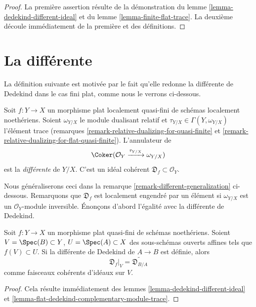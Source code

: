 \begin{proof}
La première assertion
résulte de la démonstration du lemme \ref{lemma-dedekind-different-ideal}
et du lemme \ref{lemma-finite-flat-trace}.
La deuxième découle immédiatement de la première et des
définitions.
\end{proof}



\section{La différente}
\label{section-different}

\noindent
La définition suivante est motivée par le fait qu'elle redonne la
différente de Dedekind dans le cas fini plat, comme nous le verrons ci-dessous.

\begin{definition}
\label{definition-different}
Soit $f : Y \to X$ un morphisme plat localement quasi-fini de
schémas localement noethériens.
Soient $\omega_{Y/X}$ le module dualisant relatif et
$\tau_{Y/X} \in \Gamma(Y, \omega_{Y/X})$ l'élément trace
(remarques \ref{remark-relative-dualizing-for-quasi-finite} et
\ref{remark-relative-dualizing-for-flat-quasi-finite}).
L'annulateur de
$$
\Coker(\mathcal{O}_Y \xrightarrow{\tau_{Y/X}} \omega_{Y/X})
$$
est la {\it différente} de $Y/X$. C'est un idéal cohérent
$\mathfrak{D}_f \subset \mathcal{O}_Y$.
\end{definition}

\noindent
Nous généraliserons ceci dans la remarque \ref{remark-different-generalization} ci-dessous.
Remarquons que $\mathfrak{D}_f$ est localement engendré par un élément si
$\omega_{Y/X}$ est un $\mathcal{O}_Y$-module inversible.
Énonçons d'abord l'égalité avec la différente de Dedekind.

\begin{lemma}
\label{lemma-flat-agree-dedekind}
Soit $f : Y \to X$ un morphisme plat quasi-fini de schémas noethériens.
Soient $V = \Spec(B) \subset Y$, $U = \Spec(A) \subset X$
des sous-schémas ouverts affines tels que $f(V) \subset U$.
Si la différente de Dedekind de $A \to B$ est définie, alors
$$
\mathfrak{D}_f|_V = \widetilde{\mathfrak{D}_{B/A}}
$$
comme faisceaux cohérents d'idéaux sur $V$.
\end{lemma}

\begin{proof}
Cela résulte immédiatement des lemmes \ref{lemma-dedekind-different-ideal} et
\ref{lemma-flat-dedekind-complementary-module-trace}.
\end{proof}

